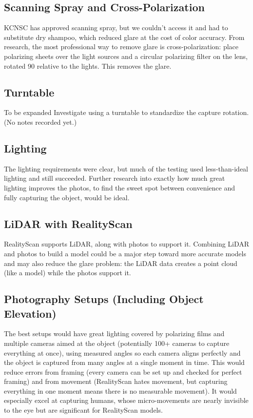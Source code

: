 \documentclass[11pt]{article}
\begin{document}
\subsection{Scanning Spray and Cross-Polarization}
KCNSC has approved scanning spray, but we couldn't access it and had to substitute dry shampoo, which reduced glare at the cost of color accuracy. From research, the most professional way to remove glare is cross-polarization: place polarizing sheets over the light sources and a circular polarizing filter on the lens, rotated 90\textdegree{} relative to the lights. This removes the glare.

\subsection{Turntable}
\begin{todobox}{To be expanded}
Investigate using a turntable to standardize the capture rotation. (No notes recorded yet.)
\end{todobox}

\subsection{Lighting}
The lighting requirements were clear, but much of the testing used less-than-ideal lighting and still succeeded. Further research into exactly how much great lighting improves the photos, to find the sweet spot between convenience and fully capturing the object, would be ideal.

\subsection{LiDAR with RealityScan}
RealityScan supports LiDAR, along with photos to support it. Combining LiDAR and photos to build a model could be a major step toward more accurate models and may also reduce the glare problem: the LiDAR data creates a point cloud (like a model) while the photos support it.

\subsection{Photography Setups (Including Object Elevation)}
The best setups would have great lighting covered by polarizing films and multiple cameras aimed at the object (potentially 100+ cameras to capture everything at once), using measured angles so each camera aligns perfectly and the object is captured from many angles at a single moment in time. This would reduce errors from framing (every camera can be set up and checked for perfect framing) and from movement (RealityScan hates movement, but capturing everything in one moment means there is no measurable movement). It would especially excel at capturing humans, whose micro-movements are nearly invisible to the eye but are significant for RealityScan models.
\end{document}
